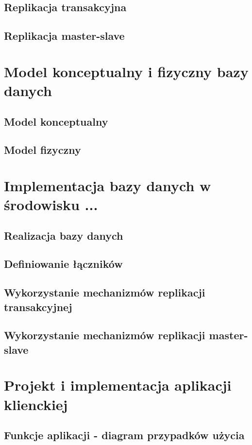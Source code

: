\documentclass{article}
\begin{document}
	\subsection{Replikacja transakcyjna}

	\subsection{Replikacja master-slave}

\section{Model konceptualny i fizyczny bazy danych}
	\subsection{Model konceptualny}

	\subsection{Model fizyczny}

\section{Implementacja bazy danych w środowisku ...}
	\subsection{Realizacja bazy danych}

	\subsection{Definiowanie łączników}
	
	\subsection{Wykorzystanie mechanizmów replikacji transakcyjnej}

	\subsection{Wykorzystanie mechanizmów replikacji master-slave}
	
\section{Projekt i implementacja aplikacji klienckiej}
	\subsection{Funkcje aplikacji - diagram przypadków użycia}
\end{document}
